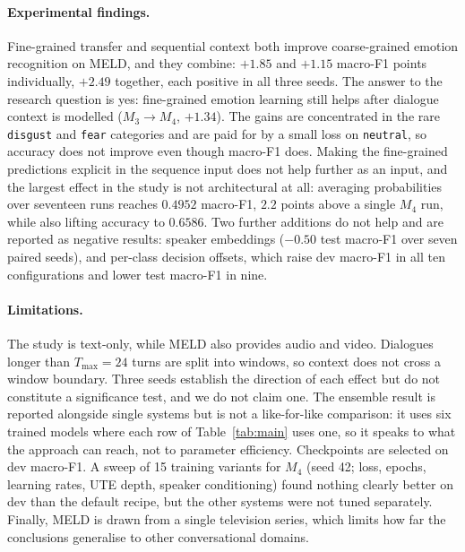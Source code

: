 \documentclass[sigconf,nonacm]{acmart}
\begin{document}
\paragraph{Experimental findings.}
Fine-grained transfer and sequential context both improve coarse-grained emotion
recognition on MELD, and they combine: $+1.85$ and $+1.15$ macro-F1 points individually,
$+2.49$ together, each positive in all three seeds. The answer to the research question is
yes: fine-grained emotion learning still helps after dialogue context is modelled
($M_3 \rightarrow M_4$, $+1.34$). The gains are concentrated in the
rare \texttt{disgust} and \texttt{fear} categories and are paid for by a small loss on
\texttt{neutral}, so accuracy does not improve even though macro-F1 does. Making the
fine-grained predictions explicit in the sequence input does not help further as an input,
and the largest effect in the study is not architectural at all: averaging probabilities
over seventeen runs reaches $0.4952$ macro-F1, $2.2$ points above a single $M_4$ run, while
also lifting accuracy to $0.6586$. Two further additions do not help and are reported as
negative results: speaker embeddings ($-0.50$ test macro-F1 over seven paired seeds), and
per-class decision offsets, which raise dev macro-F1 in all ten configurations and lower
test macro-F1 in nine.

\paragraph{Limitations.}
The study is text-only, while MELD also provides audio and video. Dialogues longer than
$T_{\max} = 24$ turns are split into windows, so context does not cross a window boundary.
Three seeds establish the direction of each effect but do not constitute a significance
test, and we do not claim one. The ensemble result is reported alongside single systems but
is not a like-for-like comparison: it uses six trained models where each row of
Table~\ref{tab:main} uses one, so it speaks to what the approach can reach, not to parameter
efficiency. Checkpoints are selected on dev macro-F1. A sweep of 15
training variants for $M_4$ (seed 42; loss, epochs, learning rates, UTE depth, speaker
conditioning) found nothing clearly better on dev than the default recipe, but the other
systems were not tuned separately. Finally, MELD is drawn from a single television series, which limits how far the
conclusions generalise to other conversational domains.
\end{document}
